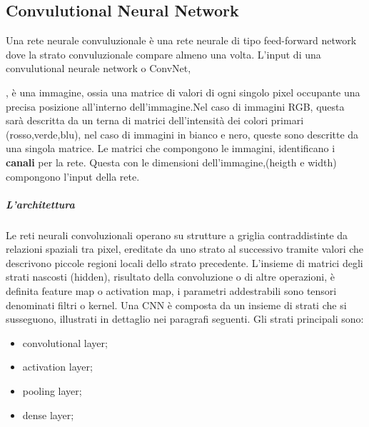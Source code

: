 \documentclass[14pt]{extarticle}
\begin{document}
\subsection{Convulutional Neural Network}
Una rete neurale convuluzionale è una rete neurale di tipo feed-forward network dove la strato convuluzionale compare almeno una volta.
L'input di una convulutional neurale network o ConvNet, , è una immagine, ossia una matrice di valori di ogni singolo pixel occupante una precisa posizione all'interno dell'immagine.Nel caso di immagini RGB, questa sarà descritta da un terna di matrici dell'intensità dei colori primari (rosso,verde,blu), nel caso di immagini in bianco e nero, queste sono descritte da una singola matrice. Le matrici che compongono le immagini, identificano i \textbf{canali} per la rete. Questa con le dimensioni dell'immagine,(heigth e width) compongono l'input della rete.
\subparagraph{L'architettura} 
Le reti neurali convoluzionali operano su strutture a griglia contraddistinte da relazioni spaziali tra pixel, ereditate da uno strato al successivo tramite valori che descrivono
piccole regioni locali dello strato precedente. L’insieme di matrici degli strati nascosti (hidden), risultato della convoluzione o di altre operazioni, è definita feature map o
activation map, i parametri addestrabili sono tensori denominati filtri o kernel.
Una CNN è composta da  un insieme di strati che si susseguono, illustrati in dettaglio nei paragrafi seguenti. Gli strati principali sono:
\begin{itemize}
\item convolutional layer;
\item activation layer;
\item pooling layer;
\item dense layer;
\end{itemize}
\cite{torresin2019sviluppo}
\end{document}
